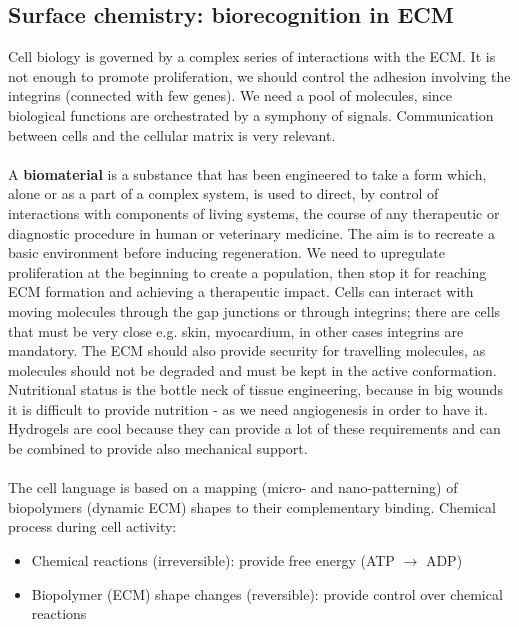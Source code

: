 \subsection{Surface chemistry: biorecognition in ECM}
Cell biology is governed by a complex series of interactions with the ECM. It is not enough to promote proliferation, we should control the adhesion involving the integrins (connected with few genes). We need a pool of molecules, since biological functions are orchestrated by a symphony of signals. Communication between cells and the cellular matrix is very relevant.
\\
\\
\noindent
A \textbf{biomaterial} is a substance that has been engineered to take a form which, alone or as a part of a complex system, is used to direct, by control of interactions with components of living systems, the course of any therapeutic or diagnostic procedure in human or veterinary medicine.
The aim is to recreate a basic environment before inducing regeneration. We need to upregulate proliferation at the beginning to create a population, then stop it for reaching ECM formation and achieving a therapeutic impact.
\noindent
Cells can interact with moving molecules through the gap junctions or through integrins; there are cells that must be very close e.g. skin, myocardium, in other cases integrins are mandatory. The ECM should also provide security for travelling molecules,  as molecules should not be degraded and must be kept in the active conformation.
Nutritional status is the bottle neck of tissue engineering, because in big wounds it is difficult to provide nutrition - as we need angiogenesis in order to have it. Hydrogels are cool because they can provide a lot of these requirements and can be combined to provide also mechanical support.
\\
\\
\noindent
The cell language is based on a mapping (micro- and nano-patterning) of biopolymers (dynamic ECM) shapes to their complementary binding. Chemical process during cell activity:
\begin{itemize}
\item Chemical reactions (irreversible): provide free energy (ATP $\rightarrow$ ADP)
\item Biopolymer (ECM) shape changes (reversible): provide control over chemical reactions
\end{itemize}

